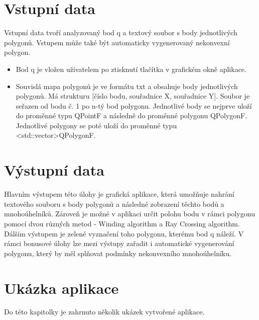 \documentclass[a4paper,11pt,twoside]{article}
\begin{document}
\newpage
{}

\vspace*{-1cm}
\section{Vstupní data}
Vstupní data tvoří analyzovaný bod q a textový soubor s body jednotlivých polygonů. Vstupem může také být automaticky vygenerovaný nekonvexní polygon.
\begin{itemize}
\item Bod q je vložen uživatelem po ztisknutí tlačítka v grafickém okně aplikace.
\item Souvislá mapa polygonů je ve formátu txt a obsahuje body jednotlivých polygonů. Má strukturu
[číslo bodu, souřadnice X, souřadnice Y]. Soubor je seřazen od bodu č. 1 po n-tý bod polygonu. Jednotlivé body se nejprve uloží do proměnné typu QPointF a následně do proměnné polygonu QPolygonF. Jednotlivé polygony se poté uloží do proměnné typu <std::vector>QPolygonF.
\end{itemize}

\section{Výstupní data}
Hlavním výstupem této úlohy je grafická aplikace, která umožňuje nahrání textového souboru s body polygonů a následné zobrazení těchto bodů a mnohoúhelníků. Zároveň je možné v aplikaci určit polohu bodu v rámci polygonu pomocí dvou různých metod - Winding algorithm a Ray Crossing algorithm. Dálším výstupem je zelené vyznačení toho polygonu, kterému bod q náleží. V rámci bonusové úlohy lze mezi výstupy zařadit i automatické vygenerování polygonu, který by měl splňovat podmínky nekonvexního mnohoúhelníku. 
\\

\newpage
{}

\vspace*{-1cm}
\section{Ukázka aplikace}
\noindent
\large
Do této kapitolky je zahrnuto několik ukázek vytvořené aplikace.
\end{document}
